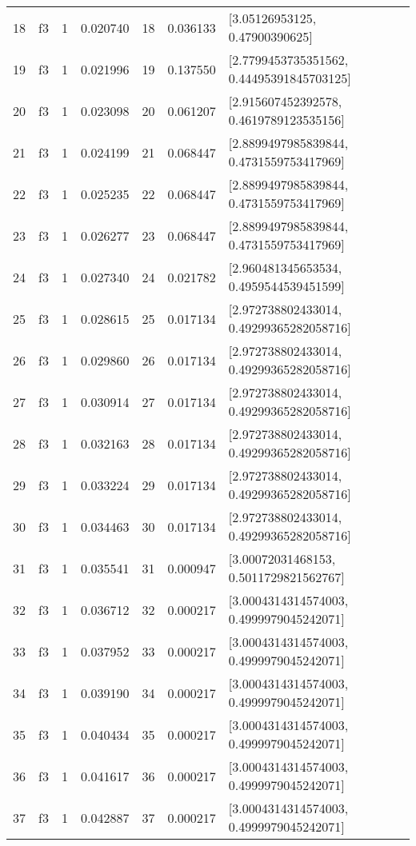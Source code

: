 \begin{tabular}{lllrlrl}
18  &  f3 &   1 &  0.020740 &   18 &  0.036133 &             [3.05126953125, 0.47900390625] \\
19  &  f3 &   1 &  0.021996 &   19 &  0.137550 &  [2.7799453735351562, 0.44495391845703125] \\
20  &  f3 &   1 &  0.023098 &   20 &  0.061207 &    [2.915607452392578, 0.4619789123535156] \\
21  &  f3 &   1 &  0.024199 &   21 &  0.068447 &   [2.8899497985839844, 0.4731559753417969] \\
22  &  f3 &   1 &  0.025235 &   22 &  0.068447 &   [2.8899497985839844, 0.4731559753417969] \\
23  &  f3 &   1 &  0.026277 &   23 &  0.068447 &   [2.8899497985839844, 0.4731559753417969] \\
24  &  f3 &   1 &  0.027340 &   24 &  0.021782 &    [2.960481345653534, 0.4959544539451599] \\
25  &  f3 &   1 &  0.028615 &   25 &  0.017134 &   [2.972738802433014, 0.49299365282058716] \\
26  &  f3 &   1 &  0.029860 &   26 &  0.017134 &   [2.972738802433014, 0.49299365282058716] \\
27  &  f3 &   1 &  0.030914 &   27 &  0.017134 &   [2.972738802433014, 0.49299365282058716] \\
28  &  f3 &   1 &  0.032163 &   28 &  0.017134 &   [2.972738802433014, 0.49299365282058716] \\
29  &  f3 &   1 &  0.033224 &   29 &  0.017134 &   [2.972738802433014, 0.49299365282058716] \\
30  &  f3 &   1 &  0.034463 &   30 &  0.017134 &   [2.972738802433014, 0.49299365282058716] \\
31  &  f3 &   1 &  0.035541 &   31 &  0.000947 &     [3.00072031468153, 0.5011729821562767] \\
32  &  f3 &   1 &  0.036712 &   32 &  0.000217 &   [3.0004314314574003, 0.4999979045242071] \\
33  &  f3 &   1 &  0.037952 &   33 &  0.000217 &   [3.0004314314574003, 0.4999979045242071] \\
34  &  f3 &   1 &  0.039190 &   34 &  0.000217 &   [3.0004314314574003, 0.4999979045242071] \\
35  &  f3 &   1 &  0.040434 &   35 &  0.000217 &   [3.0004314314574003, 0.4999979045242071] \\
36  &  f3 &   1 &  0.041617 &   36 &  0.000217 &   [3.0004314314574003, 0.4999979045242071] \\
37  &  f3 &   1 &  0.042887 &   37 &  0.000217 &   [3.0004314314574003, 0.4999979045242071] \\

\end{tabular}
